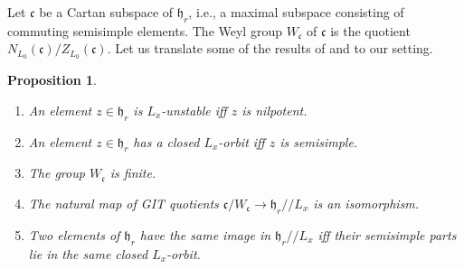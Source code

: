 \documentclass[12pt]{article}
\newtheorem{proposition}[theorem]{Proposition}
\theoremstyle{remark}
\begin{document}
Let $\mathfrak{c}$ be a Cartan subspace of $\mathfrak{h}_r$, i.e., a maximal subspace consisting of commuting semisimple elements. The Weyl group $W_{\mathfrak{c}}$ of $\mathfrak{c}$ is the quotient $N_{L_0}(\mathfrak{c})/Z_{L_0}(\mathfrak{c}).$ Let us translate some of the results of \cite{Vinberg} and \cite{Levy} to our setting.

\begin{proposition}\label{vinbergsummary}
\begin{enumerate}
\item An element $z\in\mathfrak{h}_r$ is $L_x$-unstable iff $z$ is nilpotent.
\item An element $z\in\mathfrak{h}_r$ has a closed $L_x$-orbit iff $z$ is semisimple.
\item The group $W_{\mathfrak{c}}$ is finite.
\item The natural map of GIT quotients $\mathfrak{c}/W_{\mathfrak{c}}\rightarrow\mathfrak{h}_r//L_x$ is an isomorphism.
\item Two elements of $\mathfrak{h}_r$ have the same image in $\mathfrak{h}_r//L_x$ iff their semisimple parts lie in the same closed $L_x$-orbit.
\end{enumerate}
\end{proposition}
\end{document}
